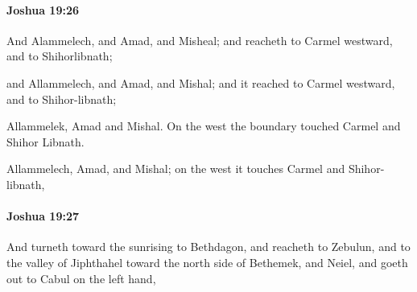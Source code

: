 		\paragraph{Joshua 19:26} %
			\label{JOSHUA-19-26}

			And Alammelech, and Amad, and Misheal; and reacheth to Carmel westward, and to Shihorlibnath;

			\begin{versebox}
					\item[BHS] 
					\item[ASV] and Allammelech, and Amad, and Mishal; and it reached to Carmel westward, and to Shihor-libnath;
					\item[NIV] Allammelek, Amad and Mishal. On the west the boundary touched Carmel and Shihor Libnath.
					\item[NRSV] Allammelech, Amad, and Mishal; on the west it touches Carmel and Shihor-libnath,
			\end{versebox}

		\paragraph{Joshua 19:27} %
			\label{JOSHUA-19-27}

			And turneth toward the sunrising to Bethdagon, and reacheth to Zebulun, and to the valley of Jiphthahel toward the north side of Bethemek, and Neiel, and goeth out to Cabul on the left hand,

